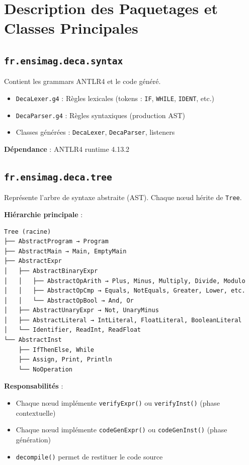 \documentclass[12pt,a4paper]{article}
\begin{document}
\section{Description des Paquetages et Classes Principales}

\subsection{\texttt{fr.ensimag.deca.syntax}}

Contient les grammars ANTLR4 et le code généré.

\begin{itemize}[itemsep=0.2em]
    \item \texttt{DecaLexer.g4} : Règles lexicales (tokens : \texttt{IF}, \texttt{WHILE}, \texttt{IDENT}, etc.)
    \item \texttt{DecaParser.g4} : Règles syntaxiques (production AST)
    \item Classes générées : \texttt{DecaLexer}, \texttt{DecaParser}, listeners
\end{itemize}

\textbf{Dépendance} : ANTLR4 runtime 4.13.2

\subsection{\texttt{fr.ensimag.deca.tree}}

Représente l'arbre de syntaxe abstraite (AST). Chaque nœud hérite de \texttt{Tree}.

\textbf{Hiérarchie principale} :

\begin{lstlisting}[style=bashstyle, numbers=none]
Tree (racine)
├── AbstractProgram → Program
├── AbstractMain → Main, EmptyMain
├── AbstractExpr
│   ├── AbstractBinaryExpr
│   │   ├── AbstractOpArith → Plus, Minus, Multiply, Divide, Modulo
│   │   ├── AbstractOpCmp → Equals, NotEquals, Greater, Lower, etc.
│   │   └── AbstractOpBool → And, Or
│   ├── AbstractUnaryExpr → Not, UnaryMinus
│   ├── AbstractLiteral → IntLiteral, FloatLiteral, BooleanLiteral
│   └── Identifier, ReadInt, ReadFloat
└── AbstractInst
    ├── IfThenElse, While
    ├── Assign, Print, Println
    └── NoOperation
\end{lstlisting}

\textbf{Responsabilités} :

\begin{itemize}[itemsep=0.2em]
    \item Chaque nœud implémente \texttt{verifyExpr()} ou \texttt{verifyInst()} (phase contextuelle)
    \item Chaque nœud implémente \texttt{codeGenExpr()} ou \texttt{codeGenInst()} (phase génération)
    \item \texttt{decompile()} permet de restituer le code source
\end{itemize}
\end{document}
